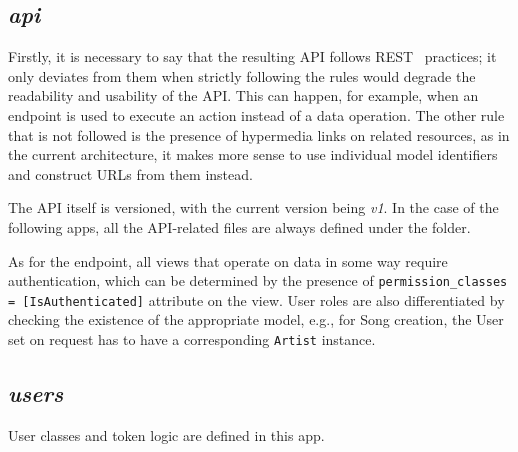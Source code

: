 \subsection{\textit{api}}
Firstly, it is necessary to say that the resulting API follows REST~\cite{restdef} practices; it only deviates from them
when strictly following the rules would degrade the readability and usability of the API.
This can happen, for example, when an endpoint is used to execute an action instead of a data operation.
The other rule that is not followed is the presence of hypermedia links on related resources,
as in the current architecture, it makes more sense to use
individual model identifiers and construct URLs from them instead.

The API itself is versioned, with the current version being \textit{v1}.
In the case of the following apps, all the API-related files are always defined under the  folder.

As for the endpoint, all views that operate on data in some way require authentication, which can be determined
by the presence of \texttt{permission_classes = [IsAuthenticated]} attribute on the view. User roles
are also differentiated by checking the existence of the appropriate model, e.g., for Song creation, the User set
on request has to have a corresponding \texttt{Artist} instance.

\subsection{\textit{users}}
User classes and token logic are defined in this app.

